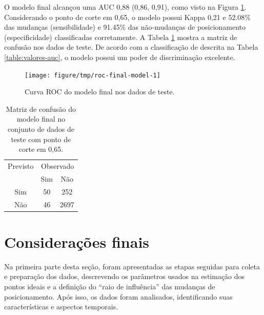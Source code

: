 \documentclass[a4paper,titlepage]{ppgi}\usepackage[]{graphicx}\usepackage[]{color}
\newenvironment{knitrout}{}{} %
\begin{document}
O modelo final alcançou uma \gls{AUC} 0,88
(0,86, 0,91),
como visto na Figura \ref{fig:roc-final-model}. Considerando o ponto de
corte em 0,65, o modelo possui Kappa
0,21 e
52.08\% das mudanças
(sensibilidade) e 91.45\%
das não-mudanças de posicionamento (especificidade) classificadas corretamente.
A Tabela \ref{table:confusion-matrix-final-model} mostra a matriz de confusão
nos dados de teste. De acordo com a classificação de 
descrita na Tabela \ref{table:valores-auc}, o modelo possui um poder de
discriminação excelente.

\begin{knitrout}
\color{fgcolor}\begin{figure}
\texttt{[image: figure/tmp/roc-final-model-1]} \caption[Curva ROC do modelo final nos dados de teste]{Curva ROC do modelo final nos dados de teste.}\label{fig:roc-final-model}
\end{figure}


\end{knitrout}

\begin{table}
\caption{Matriz de confusão do modelo final no conjunto de dados de teste com ponto de corte em 0,65.}
\label{table:confusion-matrix-final-model}
\centering
\begin{tabular}{c c c}
    Previsto & \multicolumn{2}{c}{Observado} \\  \cline{2-3}
    & \multicolumn{1}{|c}{Sim} & \multicolumn{1}{c|}{Não} \\
    \hline
    \multicolumn{1}{|c|}{Sim} & 50 & \multicolumn{1}{c|}{ 252 } \\
    \multicolumn{1}{|c|}{Não} & 46 & \multicolumn{1}{c|}{ 2697 } \\
    \hline
    \end{tabular}
\end{table}

\section{Considerações finais}

Na primeira parte desta seção, foram apresentadas as etapas seguidas para
coleta e preparação dos dados, descrevendo os parâmetros usados na estimação
dos pontos ideais e a definição do ``raio de influência'' das mudanças de
posicionamento. Após isso, os dados foram analisados, identificando suas
características e aspectos temporais.
\end{document}

